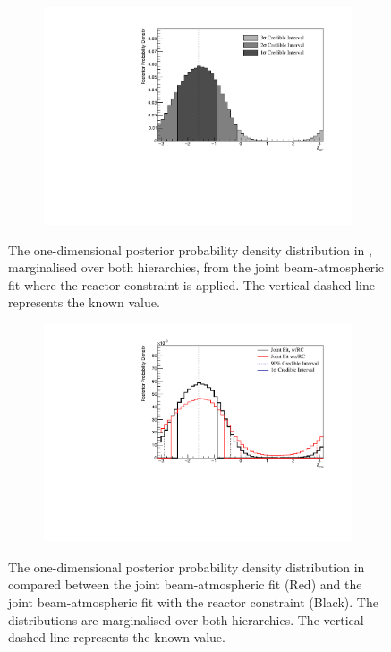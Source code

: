 \begin{figure}[h]
  \begin{subfigure}[t]{0.96\textwidth}
    \includegraphics[width=\textwidth, trim={0mm 0mm 0mm 0mm}, clip,page=1]{Figures/OA/JointFit_wRC/Contours_1D_dcp_BH_1_wRC_UnSmeared_CredibleInterval.pdf}
  \end{subfigure}
  \caption{The one-dimensional posterior probability density distribution in , marginalised over both hierarchies, from the joint beam-atmospheric fit where the reactor constraint is applied. The vertical dashed line represents the known value.}
  \label{fig:OscillationAnalysis_JointFit_wRC_DCP}
\end{figure}

\begin{figure}[h]
  \begin{subfigure}[t]{0.91\textwidth}
    \includegraphics[width=\textwidth, trim={0mm 0mm 0mm 0mm}, clip,page=1]{Figures/OA/JointFit_wRC_Comp/ContourComparison_1D_dcp_BH_2_wRC_woRC_UnSmeared_CredibleInterval.pdf}
  \end{subfigure}
  \caption{The one-dimensional posterior probability density distribution in  compared between the joint beam-atmospheric fit (Red) and the joint beam-atmospheric fit with the reactor constraint (Black). The distributions are marginalised over both hierarchies. The vertical dashed line represents the known value.}
  \label{fig:OscillationAnalysis_JointFit_wRC_Comp_DCP}
\end{figure}


